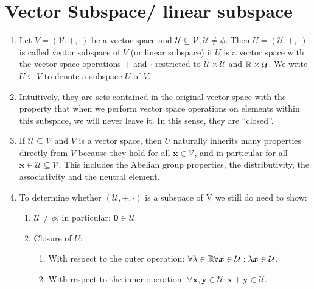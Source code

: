 \section{Vector Subspace/ linear subspace}


\begin{enumerate}
    \item 
    \begin{definition}
        Let $V = (\mathcal{V}, +, \cdot )$ be a vector space and $\mathcal{U} \subseteq \mathcal{V}, \mathcal{U} \neq \phi$. 
        Then $U = (\mathcal{U}, +, \cdot )$ is called vector subspace of $V$ (or linear subspace) if $U$ is a vector space with the vector space operations $+$ and $\cdot$  restricted to $\mathcal{U} \times \mathcal{U}$ and $\mathbb{R} \times \mathcal{U}$. 
        We write $U \subseteq V$ to denote a subspace $U$ of $V$.
        \hfill \cite{mfml/book/mml/Deisenroth-Faisal-Ong}
    \end{definition}

    \item Intuitively, they are sets contained in the original vector space with the property that when we perform vector space operations on elements within this subspace, we will never leave it. 
    In this sense, they are “closed”.
    \hfill \cite{mfml/book/mml/Deisenroth-Faisal-Ong}

    \item If $\mathcal{U} \subseteq \mathcal{V}$ and $V$ is a vector space, then $U$ naturally inherits many properties directly from $V$ because they hold for all $\bm{x} \in \mathcal{V}$, and in particular for all $\bm{x} \in \mathcal{U} \subseteq \mathcal{V}$. 
    This includes the Abelian group properties, the distributivity, the associativity and the neutral element.
    \hfill \cite{mfml/book/mml/Deisenroth-Faisal-Ong}

    \item To determine whether $(\mathcal{U}, +, \cdot)$ is a subspace of V we still do need to show:
    \begin{enumerate}
        \item $\mathcal{U} \neq \phi$, in particular: $\bm{0} \in \mathcal{U}$
        \hfill \cite{mfml/book/mml/Deisenroth-Faisal-Ong}

        \item Closure of $U$:
        \begin{enumerate}
            \item With respect to the outer operation: $\forall \lambda  \in  \mathbb{R} \forall \bm{x} \in  \mathcal{U} : \lambda \bm{x} \in  \mathcal{U}$.
            \hfill \cite{mfml/book/mml/Deisenroth-Faisal-Ong}
            
            \item With respect to the inner operation: $\forall \bm{x}, \bm{y} \in  \mathcal{U} : \bm{x} + \bm{y} \in  \mathcal{U}$.
            \hfill \cite{mfml/book/mml/Deisenroth-Faisal-Ong}
        \end{enumerate}
    \end{enumerate}

\end{enumerate}


